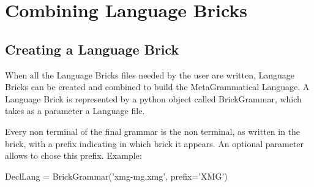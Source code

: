 \documentclass[11pt,fleqn]{book} %
\begin{document}






\chapter{Combining Language Bricks}
\section{Creating a Language Brick}
When all the Language Bricks files needed by the user are written, Language Bricks can be created and combined to build the MetaGrammatical Language. A Language Brick is represented by a python object called BrickGrammar, which takes as a parameter a Language file. 

Every non terminal of the final grammar is the non terminal, as written in the brick, with a prefix indicating in which brick it appears. An optional parameter allows to chose this prefix. Example:  
\begin{theorem}
DeclLang        = BrickGrammar('xmg-mg.xmg',      prefix='XMG')
\end{theorem}
\end{document}
